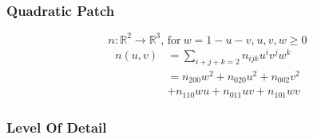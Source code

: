	\begin{frame}\frametitle{Quadratic Patch}
		\begin{equation*}
			n: \mathbb{R}^2 \rightarrow \mathbb{R}^3 \text{, for}\ w = 1 - u - v \text{,}\ u, v, w \geq 0 
		\end{equation*}
		\begin{equation*}
			\begin{aligned}
			n(u,v) & = \sum\limits_{i+j+k=2} n_{ijk} u^i v^j w^k\\
			& = n_{200} w^2 + n_{020} u^2 + n_{002} v^2\\
			& + n_{110} w u + n_{011} u v + n_{101} w v
			\end{aligned}
		\end{equation*}
	\end{frame}	

	\begin{frame}
		\frametitle{Level Of Detail}
		\begin{columns}
			\begin{column}[b]{0.22\textwidth}
				\begin{center}

\end{center}
\end{column}
\end{columns}
\end{frame}
